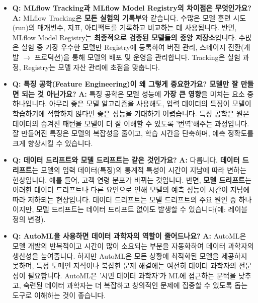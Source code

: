 \documentclass[11pt,a4paper]{article}
\begin{document}
\begin{tcolorbox}[summarybox={초심자를 위한 Q\&A}]
\begin{itemize}
    \item \textbf{Q: MLflow Tracking과 MLflow Model Registry의 차이점은 무엇인가요?}
    \textbf{A:} MLflow Tracking은 \textbf{모든 실험의 기록부}와 같습니다. 수많은 모델 훈련 시도(run)의 매개변수, 지표, 아티팩트를 기록하고 비교하는 데 사용됩니다. 반면, MLflow Model Registry는 \textbf{최종적으로 검증된 모델들의 중앙 저장소}입니다. 수많은 실험 중 가장 우수한 모델만 Registry에 등록하여 버전 관리, 스테이지 전환(개발 $\rightarrow$ 프로덕션)을 통해 모델의 배포 및 운영을 관리합니다. Tracking은 실험 과정, Registry는 모델 자산 관리에 초점을 맞춥니다.

    \item \textbf{Q: 특징 공학(Feature Engineering)이 왜 그렇게 중요한가요? 모델만 잘 만들면 되는 것 아닌가요?}
    \textbf{A:} 특징 공학은 모델 성능에 \textbf{가장 큰 영향}을 미치는 요소 중 하나입니다. 아무리 좋은 모델 알고리즘을 사용해도, 입력 데이터의 특징이 모델이 학습하기에 적합하지 않다면 좋은 성능을 기대하기 어렵습니다. 특징 공학은 원본 데이터의 숨겨진 패턴을 모델이 더 잘 이해할 수 있도록 '번역'해주는 과정입니다. 잘 만들어진 특징은 모델의 복잡성을 줄이고, 학습 시간을 단축하며, 예측 정확도를 크게 향상시킬 수 있습니다.

    \item \textbf{Q: 데이터 드리프트와 모델 드리프트는 같은 것인가요?}
    \textbf{A:} 다릅니다. \textbf{데이터 드리프트}는 모델의 입력 데이터(특징)의 통계적 특성이 시간이 지남에 따라 변하는 현상입니다. 예를 들어, 고객 연령 분포가 바뀌는 것입니다. 반면, \textbf{모델 드리프트}는 이러한 데이터 드리프트나 다른 요인으로 인해 모델의 예측 성능이 시간이 지남에 따라 저하되는 현상입니다. 데이터 드리프트는 모델 드리프트의 주요 원인 중 하나이지만, 모델 드리프트는 데이터 드리프트 없이도 발생할 수 있습니다(예: 레이블 정의 변경).

    \item \textbf{Q: AutoML을 사용하면 데이터 과학자의 역할이 줄어드나요?}
    \textbf{A:} AutoML은 모델 개발의 반복적이고 시간이 많이 소요되는 부분을 자동화하여 데이터 과학자의 생산성을 높여줍니다. 하지만 AutoML은 모든 상황에 최적화된 모델을 제공하지 못하며, 특정 도메인 지식이나 복잡한 문제 해결에는 여전히 데이터 과학자의 전문성이 필요합니다. AutoML은 '시민 데이터 과학자'가 ML에 접근하는 문턱을 낮추고, 숙련된 데이터 과학자는 더 복잡하고 창의적인 문제에 집중할 수 있도록 돕는 도구로 이해하는 것이 좋습니다.


\end{itemize}
\end{tcolorbox}
\end{document}
